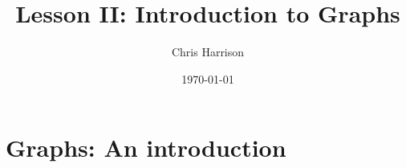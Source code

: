\documentclass[11pt,a4paper]{article}
\title{Lesson II: Introduction to Graphs}
\author{Chris Harrison}
\date{\today}
\begin{document}
\maketitle 

\section{Graphs: An introduction}
\label{title}
\end{document}
